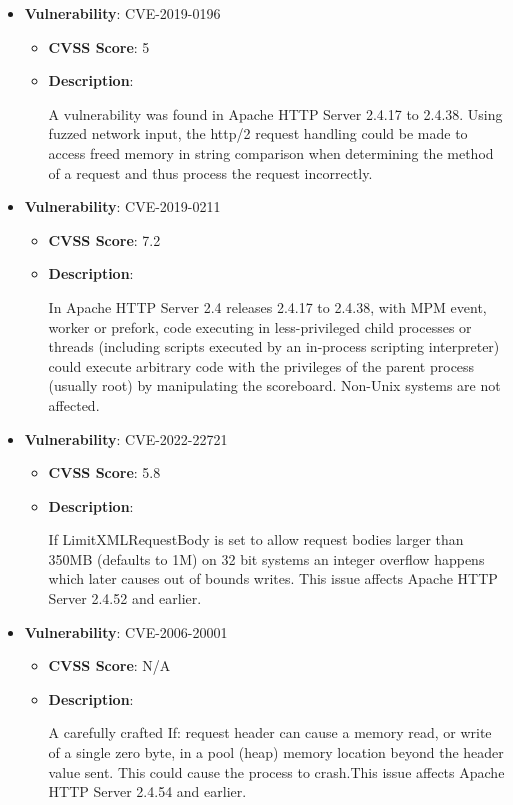 \documentclass{article}
\begin{document}
\begin{itemize}
        \item \textbf{Vulnerability}: CVE-2019-0196
        \begin{itemize}
            \item \textbf{CVSS Score}:  5 
            \item \textbf{Description}:
            \parbox[t]{0.9\linewidth}{
                \ttfamily A vulnerability was found in Apache HTTP Server 2.4.17 to 2.4.38. Using fuzzed network input, the http/2 request handling could be made to access freed memory in string comparison when determining the method of a request and thus process the request incorrectly.
            }
        \end{itemize}
    
        \item \textbf{Vulnerability}: CVE-2019-0211
        \begin{itemize}
            \item \textbf{CVSS Score}:  7.2 
            \item \textbf{Description}:
            \parbox[t]{0.9\linewidth}{
                \ttfamily In Apache HTTP Server 2.4 releases 2.4.17 to 2.4.38, with MPM event, worker or prefork, code executing in less-privileged child processes or threads (including scripts executed by an in-process scripting interpreter) could execute arbitrary code with the privileges of the parent process (usually root) by manipulating the scoreboard. Non-Unix systems are not affected.
            }
        \end{itemize}
    
        \item \textbf{Vulnerability}: CVE-2022-22721
        \begin{itemize}
            \item \textbf{CVSS Score}:  5.8 
            \item \textbf{Description}:
            \parbox[t]{0.9\linewidth}{
                \ttfamily If LimitXMLRequestBody is set to allow request bodies larger than 350MB (defaults to 1M) on 32 bit systems an integer overflow happens which later causes out of bounds writes. This issue affects Apache HTTP Server 2.4.52 and earlier.
            }
        \end{itemize}
    
        \item \textbf{Vulnerability}: CVE-2006-20001
        \begin{itemize}
            \item \textbf{CVSS Score}:  N/A 
            \item \textbf{Description}:
            \parbox[t]{0.9\linewidth}{
                \ttfamily A carefully crafted If: request header can cause a memory read, or write of a single zero byte, in a pool (heap) memory location beyond the header value sent. This could cause the process to crash.This issue affects Apache HTTP Server 2.4.54 and earlier.
            }
        \end{itemize}
    

\end{itemize}
\end{document}
